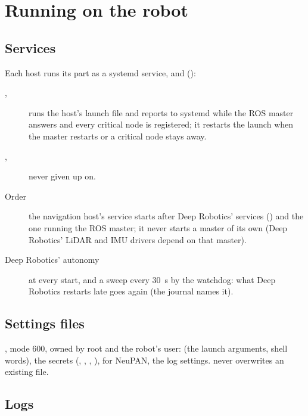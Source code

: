 \chapter{Running on the robot}
\label{ch:a-operations}

\section{Services}

Each host runs its part as a systemd service,  and 
():

\begin{description}
  \item[, ]  runs the host's launch file
    and reports to systemd while the ROS master answers and every critical node is registered;
    it restarts the launch when the master restarts or a critical node stays away.
  \item[, ] never given up on.
  \item[Order] the navigation host's service starts after Deep Robotics' services ()
    and the one running the ROS master; it never starts a master of its own (Deep Robotics' LiDAR
    and IMU drivers depend on that master).
  \item[Deep Robotics' autonomy]  at every start, and a sweep every
    \SI{30}{s} by the watchdog: what Deep Robotics restarts late goes again (the journal names it).
\end{description}

\section{Settings files}

, mode 600, owned by root and the robot's user: 
(the launch arguments, shell words), the secrets (, ,
, ),  for NeuPAN, the log
settings.  never overwrites an existing file.

\section{Logs}

